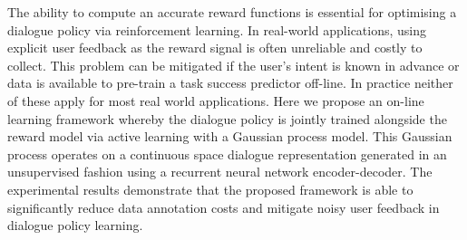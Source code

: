 The ability to compute an accurate reward functions is essential for optimising a dialogue policy via reinforcement learning. In real-world applications, using explicit user feedback as the reward signal is often unreliable and costly to collect. This problem can be mitigated if the user's intent is known in advance or data is available to pre-train a task success predictor off-line. In practice neither of these apply for most real world applications. Here we propose an on-line learning framework whereby the dialogue policy is jointly trained  alongside the reward model via active learning with a Gaussian process model. This Gaussian process operates on a continuous space dialogue representation generated in an unsupervised fashion using a recurrent neural network encoder-decoder. The experimental results demonstrate that the proposed framework is able to significantly reduce data annotation costs and mitigate noisy user feedback in dialogue policy learning.
